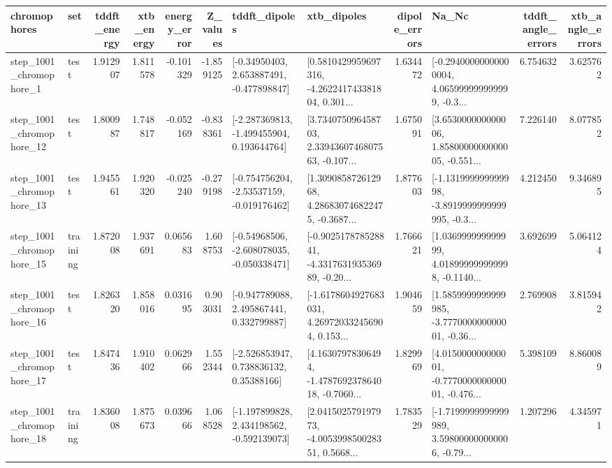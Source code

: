 \begin{tabular}{llrrrrllrlrr}
\toprule
             chromophores &       set &  tddft\_energy &  xtb\_energy &  energy\_error &  Z\_values &                               tddft\_dipoles &                                        xtb\_dipoles &  dipole\_errors &                                              Na\_Nc &  tddft\_angle\_errors &  xtb\_angle\_errors \\
\midrule
  step\_1001\_chromophore\_1 &      test &      1.912907 &    1.811578 &     -0.101329 & -1.859125 &    [-0.34950403, 2.653887491, -0.477898847] &  [0.5810429959697316, -4.262241743381804, 0.301... &       1.634472 &  [-0.29400000000000004, 4.065999999999999, -0.3... &            6.754632 &          3.625762 \\
 step\_1001\_chromophore\_12 &      test &      1.800987 &    1.748817 &     -0.052169 & -0.838361 &   [-2.287369813, -1.499455904, 0.193644764] &  [3.734075096458703, 2.3394360746807563, -0.107... &       1.675091 &  [3.653000000000006, 1.8580000000000005, -0.551... &            7.226140 &          8.077852 \\
 step\_1001\_chromophore\_13 &      test &      1.945561 &    1.920320 &     -0.025240 & -0.279198 &   [-0.754756204, -2.53537159, -0.019176462] &  [1.309085872612968, 4.286830746822475, -0.3687... &       1.877603 &  [-1.131999999999998, -3.8919999999999995, -0.3... &            4.212450 &          9.346895 \\
 step\_1001\_chromophore\_15 &  training &      1.872008 &    1.937691 &      0.065683 &  1.608753 &   [-0.54968506, -2.608078035, -0.050338471] &  [-0.902517878528841, -4.331763193536989, -0.20... &       1.766621 &  [1.036999999999999, 4.018999999999998, -0.1140... &            3.692699 &          5.064124 \\
 step\_1001\_chromophore\_16 &      test &      1.826320 &    1.858016 &      0.031695 &  0.903031 &    [-0.947789088, 2.495867441, 0.332799887] &  [-1.6178604927683031, 4.269720332456904, 0.153... &       1.904659 &  [1.5859999999999985, -3.777000000000001, -0.36... &            2.769908 &          3.815942 \\
 step\_1001\_chromophore\_17 &      test &      1.847436 &    1.910402 &      0.062966 &  1.552344 &     [-2.526853947, 0.738836132, 0.35388166] &  [4.16307978306494, -1.478769237864018, -0.7060... &       1.829969 &  [4.015000000000001, -0.777000000000001, -0.476... &            5.398109 &          8.860089 \\
 step\_1001\_chromophore\_18 &  training &      1.836008 &    1.875673 &      0.039666 &  1.068528 &   [-1.197899828, 2.434198562, -0.592139073] &  [2.041502579197973, -4.005399850028351, 0.5668... &       1.783529 &  [-1.7199999999999989, 3.598000000000006, -0.79... &            1.207296 &          4.345971 \\

\end{tabular}

